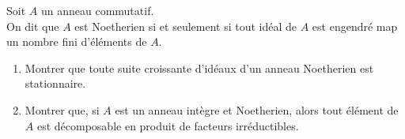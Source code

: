 \begin{exer}
Soit $A$ un anneau commutatif.\\
On dit que $A$ est Noetherien si et seulement si tout idéal de $A$ est engendré map un nombre fini d'éléments de $A$.
\begin{enumerate}
\item Montrer que toute suite croissante d'idéaux d'un anneau Noetherien est stationnaire.
\item Montrer que, si $A$ est un anneau intègre et Noetherien, alors tout élément de $A$ est décomposable en produit de facteurs irréductibles.
\end{enumerate}
\end{exer}

